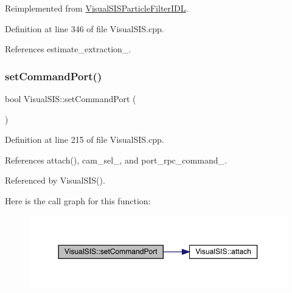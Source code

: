 Reimplemented from \hyperlink{classVisualSISParticleFilterIDL_a40d91826291e2bae76f4545254307577}{Visual\+S\+I\+S\+Particle\+Filter\+I\+DL}.



Definition at line 346 of file Visual\+S\+I\+S.\+cpp.



References estimate\+\_\+extraction\+\_\+.

\mbox{\label{classVisualSIS_aac85d36ec741ed93d1659ddf910f7a03}} 
\subsubsection{\texorpdfstring{set\+Command\+Port()}{setCommandPort()}}
{\footnotesize\ttfamily bool Visual\+S\+I\+S\+::set\+Command\+Port (\begin{DoxyParamCaption}{ }\end{DoxyParamCaption})\hspace{0.3cm}{\ttfamily [protected]}}



Definition at line 215 of file Visual\+S\+I\+S.\+cpp.



References attach(), cam\+\_\+sel\+\_\+, and port\+\_\+rpc\+\_\+command\+\_\+.



Referenced by Visual\+S\+I\+S().

Here is the call graph for this function\+:
\nopagebreak
\begin{figure}[H]
\begin{center}
\leavevmode
\includegraphics[width=350pt]{classVisualSIS_aac85d36ec741ed93d1659ddf910f7a03_cgraph}
\end{center}
\end{figure}
\mbox{\label{classVisualSIS_ac9905862d7198c5ae80f7e682500c608}} 
